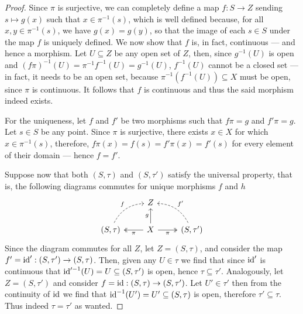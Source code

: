 \begin{proof}
    Since \(\pi\) is surjective, we can completely define a map \(f: S \to Z\)
    sending \(s \mapsto g(x)\) such that \(x \in \pi^{-1}(s)\), which is well
    defined because, for all \(x, y \in \pi^{-1}(s)\), we have \(g(x) = g(y)\), so
    that the image of each \(s \in S\) under the map \(f\) is uniquely defined. We
    now show that \(f\) is, in fact, continuous --- and hence a morphism. Let
    \(U \subseteq Z\) be any open set of \(Z\), then, since \(g^{-1}(U)\) is open
    and \((f \pi)^{-1}(U) = \pi^{-1} f^{-1}(U) = g^{-1}(U)\), \(f^{-1}(U)\) cannot
    be a closed set --- in fact, it needs to be an open set, because
    \(\pi^{-1}(f^{-1}(U)) \subseteq X\) must be open, since \(\pi\) is continuous.
    It follows that \(f\) is continuous and thus the said morphism indeed exists.

    For the uniqueness, let \(f\) and \(f'\) be two morphisms such that \(f\pi = g\)
    and \(f'\pi = g\). Let \(s \in S\) be any point. Since \(\pi\) is surjective,
    there exists \(x \in X\) for which \(x \in \pi^{-1}(s)\), therefore,
    \(f \pi(x) = f(s) = f'\pi(x) = f'(s)\) for every element of their domain ---
    hence \(f = f'\).

    Suppose now that both \((S, \tau)\) and \((S, \tau')\) satisfy the
    universal property, that is, the following diagrams commutes for unique
    morphisms \(f\) and \(h\)
    \[
        \begin{tikzcd}
            &Z & \\
            (S, \tau) \ar[ur, dashed, bend left, "f"]
            &X \ar[l, two heads, "\pi"] \ar[r, swap, two heads, "\pi"] \ar[u, "g"]
            &(S, \tau') \ar[ul, dashed, bend right, swap, "f'"]
        \end{tikzcd}
    \]
    Since the diagram commutes for all \(Z\), let \(Z = (S, \tau)\), and
    consider the map \(f' = \operatorname{id}': (S, \tau') \to (S, \tau)\). Then,
    given any \(U \in \tau\) we find that since \(\operatorname{id}'\) is continuous that
    \(\operatorname{id}'^{-1}(U) = U \subseteq (S, \tau')\) is open, hence
    \(\tau \subseteq \tau'\). Analogously, let \(Z = (S, \tau')\)
    and consider \(f = \operatorname{id}: (S, \tau) \to (S, \tau')\). Let
    \(U' \in \tau'\) then from the continuity of \(\operatorname{id}\) we find that
    \(\operatorname{id}^{-1}(U') = U' \subseteq (S, \tau)\) is open, therefore
    \(\tau' \subseteq \tau\). Thus indeed \(\tau = \tau'\)
    as wanted.
\end{proof}

